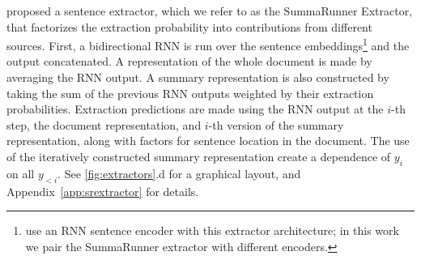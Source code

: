 
\citet{nallapati2017summarunner} proposed
a sentence extractor, which we refer to as the SummaRunner Extractor,
that factorizes the extraction probability into contributions 
from different sources.
First, a bidirectional RNN is run over the sentence embeddings\footnote{\citet{nallapati2017summarunner}
    use an RNN sentence encoder with 
this extractor architecture; in this work we pair the SummaRunner extractor
with different encoders. } and the output
concatenated. A representation of the whole document is made by 
averaging the RNN output. A summary representation is also constructed 
by taking the sum of the previous RNN outputs weighted by their extraction
probabilities. Extraction predictions are made using 
the RNN output at the $i$-th step, the document representation, and 
$i$-th version of the summary representation, along with factors for 
sentence location in the document. The use of the iteratively constructed
summary representation create a dependence of $y_i$ on all $y_{<i}$.
See \autoref{fig:extractors}.d for a graphical layout,
and Appendix~\ref{app:srextractor} for details.




